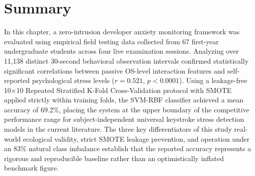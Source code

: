 \section{Summary}
In this chapter, a zero-intrusion developer anxiety monitoring framework was evaluated using empirical field testing data collected from 67 first-year undergraduate students across four live examination sessions. Analyzing over 11,138 distinct 30-second behavioral observation intervals confirmed statistically significant correlations between passive OS-level interaction features and self-reported psychological stress levels ($r = 0.521$, $p < 0.0001$). Using a leakage-free 10$\times$10 Repeated Stratified K-Fold Cross-Validation protocol with SMOTE applied strictly within training folds, the SVM-RBF classifier achieved a mean accuracy of 69.2\%, placing the system at the upper boundary of the competitive performance range for subject-independent universal keystroke stress detection models in the current literature. The three key differentiators of this study  real-world ecological validity, strict SMOTE leakage prevention, and operation under an 83\% natural class imbalance  establish that the reported accuracy represents a rigorous and reproducible baseline rather than an optimistically inflated benchmark figure.